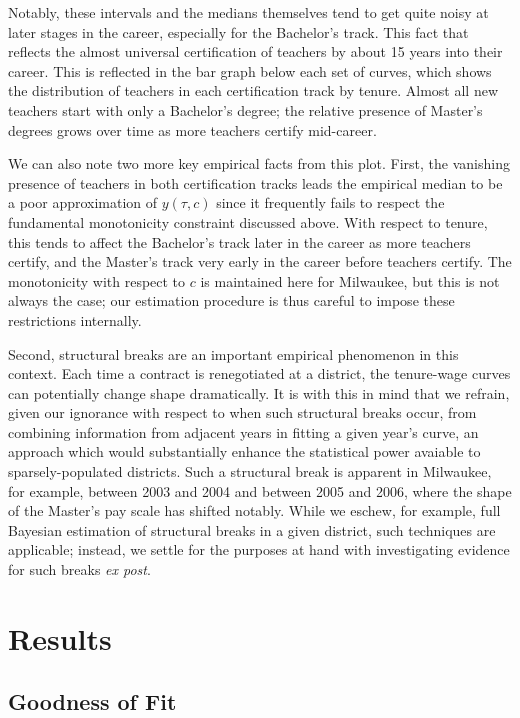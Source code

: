 \documentclass[]{article}
\begin{document}
Notably, these intervals and the medians themselves tend to get quite
noisy at later stages in the career, especially for the Bachelor's
track. This fact that reflects the almost universal certification of
teachers by about 15 years into their career. This is reflected in the
bar graph below each set of curves, which shows the distribution of
teachers in each certification track by tenure. Almost all new teachers
start with only a Bachelor's degree; the relative presence of Master's
degrees grows over time as more teachers certify mid-career.

We can also note two more key empirical facts from this plot. First, the
vanishing presence of teachers in both certification tracks leads the
empirical median to be a poor approximation of \(y(\tau, c)\) since it
frequently fails to respect the fundamental monotonicity constraint
discussed above. With respect to tenure, this tends to affect the
Bachelor's track later in the career as more teachers certify, and the
Master's track very early in the career before teachers certify. The
monotonicity with respect to \(c\) is maintained here for Milwaukee, but
this is not always the case; our estimation procedure is thus careful to
impose these restrictions internally.

Second, structural breaks are an important empirical phenomenon in this
context. Each time a contract is renegotiated at a district, the
tenure-wage curves can potentially change shape dramatically. It is with
this in mind that we refrain, given our ignorance with respect to when
such structural breaks occur, from combining information from adjacent
years in fitting a given year's curve, an approach which would
substantially enhance the statistical power avaiable to
sparsely-populated districts. Such a structural break is apparent in
Milwaukee, for example, between 2003 and 2004 and between 2005 and 2006,
where the shape of the Master's pay scale has shifted notably. While we
eschew, for example, full Bayesian estimation of structural breaks in a
given district, such techniques are applicable; instead, we settle for
the purposes at hand with investigating evidence for such breaks
\emph{ex post}.

\section{Results}\label{results}

\subsection{Goodness of Fit}\label{goodness-of-fit}
\end{document}

